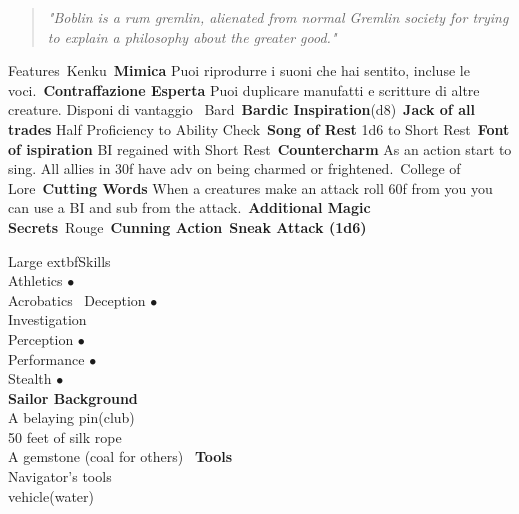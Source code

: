 \documentclass[11pt]{article}
\newcommand*\circled[1]{\tikz[baseline=(char.base)]{
\node[shape=circle,draw,inner sep=2pt] (char) {#1};}}
\begin{document}
\vspace{0.5cm}
\begin{quote}
\textit{\Fontauri "Boblin is a rum gremlin, alienated from normal Gremlin society for trying to explain a philosophy about the greater good."}
\end{quote}
\begin{minipage}[t]{.5\textwidth}
{\huge \Fontauri Features}\
\textcolor{OCRA}{Kenku}\
\textbf{Mimica} Puoi riprodurre i suoni che hai sentito, incluse le voci.\
\textbf{Contraffazione Esperta} Puoi duplicare manufatti e scritture di altre creature. Disponi di vantaggio \
\textcolor{OCRA}{Bard}\
\textbf{Bardic Inspiration}(d8)\
\textbf{Jack of all trades} Half Proficiency to Ability Check\
\textbf{Song of Rest} 1d6 to Short Rest\
\textbf{Font of ispiration} BI regained with Short Rest\
\textbf{Countercharm} As an action start to sing. All allies in 30f have adv on being charmed or frightened.\
\textcolor{OCRA}{College of Lore}\
\textbf{Cutting Words} When a creatures make an attack roll 60f from you you can use a BI and sub from the attack.\
\textbf{Additional Magic Secrets}\
\textcolor{OCRA}{Rouge}\
\textbf{Cunning Action}\
\textbf{Sneak Attack (1d6)}\
\end{minipage}
\begin{minipage}[t]{.4\textwidth}\raggedleft
\begin{center}
{\Huge \textgoth{P}} \circled{\Huge +4} \hspace{0.3cm} {\Huge \textgoth{A}} \circled{\Huge+8} \hspace{0.3cm} {\Huge {}} \circled{\Huge+9}
\end{center}
\vspace{0.5cm}
{Large 	extbf{\Fontauri Skills}}\\
Athletics $\bullet$\\
Acrobatics \ 
Deception $\bullet$\\ 
Investigation \\
Perception $\bullet$ \\
Performance $\bullet$\\ 
Stealth $\bullet$ \\
\vspace{.5cm}
{\Large \textbf{\Fontauri Sailor Background}}\\
A belaying pin(club)\\
50 feet of silk rope\\
A gemstone (coal for others)\
\vspace{0.5cm}
{\Large \textbf{ \Fontauri Tools}}\\
Navigator's tools\\
vehicle(water)\\
\end{minipage}
\end{document}
